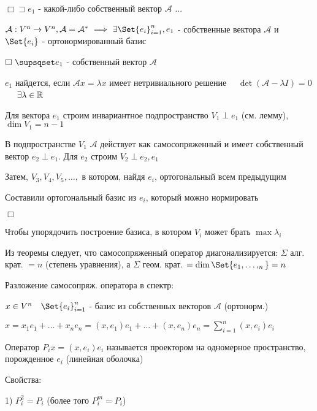 \documentclass[12pt]{article}
\begin{document}
    $\Box \sqsupset e_1$ - какой-либо собственный вектор $\mathcal{A}$ ...


    \Th $\mathcal{A}: V^n \to V^n, \mathcal{A} = \mathcal{A}^* \ \Longrightarrow \ \exists \Set{e_i}^n_{i=1}, e_1$ -
    собственные вектора $\mathcal{A}$ и $\Set{e_i}$ - ортонормированный базис

    $\Box \ \supsqset e_1$ - собственный вектор $\mathcal{A}$

    $e_1$ найдется, если $\mathcal{A}x = \lambda x$ имеет нетривиального решение \ \Longleftrightarrow \
    $\det(\mathcal{A} - \lambda I) = 0$ \  \ $\exists \lambda \in \mathbb{R}$

    Для вектора $e_1$ строим инвариантное подпространство $V_1 \perp e_1$ (см. лемму), $\dim V_1 = n - 1$

    В подпространстве $V_1$ $\mathcal{A}$ действует как самосопряженный и имеет собственный вектор $e_2 \perp e_1$.
    Для $e_2$ строим $V_2 \perp e_2, e_1$

    Затем, $V_3, V_4, V_5, \dots,$ в котором, найдя $e_i$, ортогональный всем предыдущим

    Составили ортогональный базис из $e_i$, который можно нормировать

    $\Box$

    \Nota Чтобы упорядочить построение базиса, в котором $V_i$ может брать $\max \lambda_i$

    \Nota Из теоремы следует, что самосопряженный оператор диагонализируется: $\Sigma$ алг. крат. $ = n$ (степень уравнения), а $\Sigma$ геом. крат. $= \dim \Set{e_1, \dots, _n} = n$

    \hypertarget{spectraldecomposition}{}

    Разложение самосопряж. оператора в спектр:

    $x \in V^n \quad \Set{e_i}_{i=1}^n$ - базис из собственных векторов $\mathcal{A}$ (ортонорм.)

    $x = x_1 e_1 + \dots + x_n e_n = (x, e_1) e_1 + \dots + (x, e_n) e_n = \sum_{i = 1}^{n} (x, e_i) e_i$

    \hypertarget{projector}{}

    \Def Оператор $P_i x = (x, e_i) e_i$ называется проектором на одномерное пространство, порожденное $e_i$ (линейная оболочка)

    Свойства:

    1) $P_i^2 = P_i$ (более того $P^m_i = P_i$)
\end{document}
